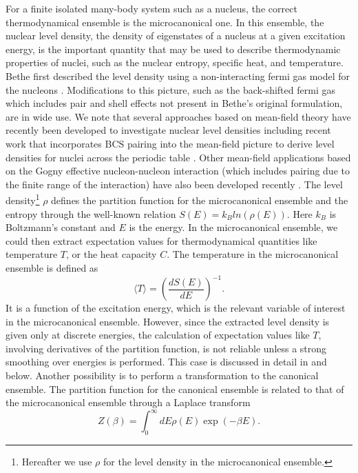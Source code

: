 \documentclass[preprint,rmp,aps,floatfix]{revtex4}
\begin{document}
For a finite isolated many-body system such as a nucleus, the correct
thermodynamical ensemble is the microcanonical one. In this ensemble,
the nuclear level density, the density of eigenstates of a nucleus
at a given excitation energy, is the important quantity that may be
used to describe thermodynamic properties of nuclei, such as the 
nuclear entropy, specific heat, and temperature. 
Bethe first described the level density using a 
non-interacting fermi gas model
for the nucleons \cite{bethe1}. Modifications to this picture, such as the 
back-shifted fermi gas which includes pair and
shell effects \cite{back_shift}
not present in Bethe's original formulation, are in 
wide use.  We note that several approaches based on mean-field 
theory have recently been developed to 
investigate nuclear level densities including recent work 
that incorporates BCS pairing into the mean-field picture 
to derive level densities for nuclei across the periodic table 
\cite{demetriou01}. Other mean-field applications based on the
Gogny effective nucleon-nucleon interaction (which includes 
pairing due to the finite range of the interaction) have also been 
developed recently \cite{hilaire01}. 
The level density\footnote{Hereafter we use $\rho$ for the level 
density in the microcanonical ensemble.} 
$\rho$ defines the partition function for 
the microcanonical ensemble and the entropy through the well-known
relation $S(E)=k_Bln(\rho(E))$.
Here $k_B$ is Boltzmann's constant and $E$ is the energy.  In 
the microcanonical ensemble, we could then extract expectation values 
for thermodynamical quantities like temperature $T$, or the 
heat capacity $C$. The temperature in the microcanonical ensemble 
is defined as 
\begin{equation}
      \langle T\rangle=\left(\frac{dS(E)}{dE}\right)^{-1}.
      \label{eq:temp}
\end{equation}
It is a function of the excitation energy, which is 
the relevant variable of interest in the microcanonical ensemble. 
However, since the extracted level density is given only at discrete 
energies, the calculation of expectation values 
like $T$, involving derivatives of the partition function, is not
reliable unless a strong smoothing over energies is 
performed. This case is discussed in detail in  \cite{oslo3} 
and below. Another possibility
is to perform a transformation to the canonical ensemble.
The partition function for the 
canonical ensemble is related to that of the 
microcanonical ensemble through a Laplace transform
\begin{equation}
     Z(\beta)=\int_0^{\infty}dE\rho(E)\exp{(-\beta E)}.
     \label{eq:zcan}
\end{equation}
\end{document}
